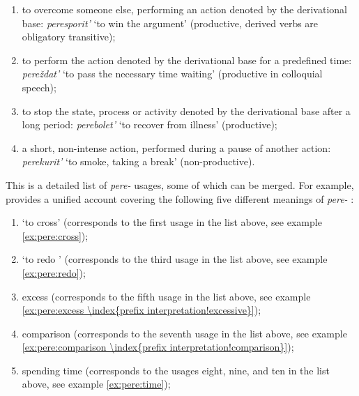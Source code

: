 \begin{enumerate}
\item to overcome someone else, performing an action denoted by the derivational base: \textit{peresporit'} `to win the argument' (productive, derived verbs are obligatory transitive); 
\item to perform the action denoted by the derivational base for a predefined time: \textit{pere\v{z}dat'} `to pass the necessary time waiting' (productive in colloquial speech);
\item to stop the state, process or activity denoted by the derivational base after a long period: \textit{perebolet'} `to recover from illness' (productive); 
\item a short, non-intense action, performed during a pause of another action: \textit{perekurit'} `to smoke, taking a break' (non-productive).
\end{enumerate} 

This is a detailed list of \textit{pere-}   usages, some of which can be merged. For example, \citet[119--125]{Kagan:book} provides a unified account covering the following five different meanings of \textit{pere-}  : 
\begin{enumerate}
\item `to cross'  (corresponds to the first usage in the list above, see example \ref{ex:pere:cross});
\item `to redo ' (corresponds to the third usage in the list above, see example \ref{ex:pere:redo});
\item excess  (corresponds to the fifth usage in the list above, see example \ref{ex:pere:excess \index{prefix interpretation!excessive}});
\item comparison  (corresponds to the seventh usage in the list above, see example \ref{ex:pere:comparison \index{prefix interpretation!comparison}});
\item spending time (corresponds to the usages eight, nine, and ten in the list above, see example \ref{ex:pere:time});
\end{enumerate}

